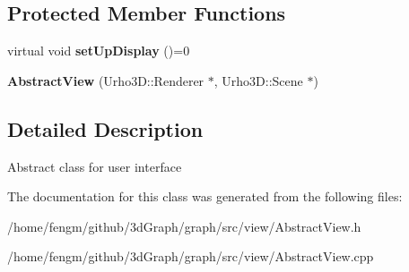 \subsection*{Protected Member Functions}
\begin{DoxyCompactItemize}
\item 
\mbox{\label{class_abstract_view_aaaead4f6e4ba76e31f998242b3a22d4e}} 
virtual void {\bfseries set\+Up\+Display} ()=0
\item 
\mbox{\label{class_abstract_view_abd5c0cc2a32ae8ec6bb3f27ccbc8c6f6}} 
{\bfseries Abstract\+View} (Urho3\+D\+::\+Renderer $\ast$, Urho3\+D\+::\+Scene $\ast$)
\end{DoxyCompactItemize}


\subsection{Detailed Description}
Abstract class for user interface 

The documentation for this class was generated from the following files\+:\begin{DoxyCompactItemize}
\item 
/home/fengm/github/3d\+Graph/graph/src/view/Abstract\+View.\+h\item 
/home/fengm/github/3d\+Graph/graph/src/view/Abstract\+View.\+cpp\end{DoxyCompactItemize}
